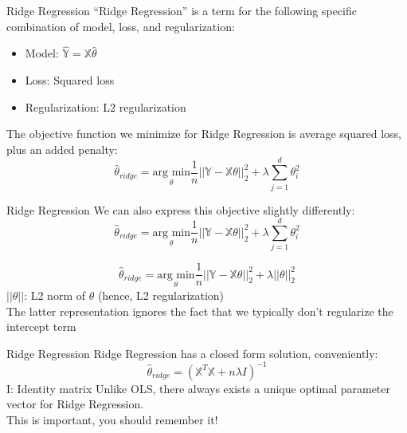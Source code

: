 \documentclass[aspectratio=169]{../latex_main/tntbeamer}  %
\begin{document}
		\begin{frame}{Ridge Regression}
	    “Ridge Regression” is a term for the following specific combination of model, loss, and regularization:
	    \begin{itemize}
	        \item Model: $\mathbb{\hat{Y}} = \mathbb{X}\hat{\theta}$
	        \item Loss: Squared loss
	        \item Regularization: L2 regularization
	    \end{itemize}
	    The objective function we minimize for Ridge Regression is average squared loss, plus an added penalty:
	    \begin{equation*}
	        \hat{\theta}_{ridge} = \underset{\theta}{\text{arg min}}\frac{1}{n}||\mathbb{Y} - \mathbb{X}\theta||_2^2 + \lambda \sum\limits_{j=1}^d\theta_i^2 
	    \end{equation*}
	\end{frame}
	
	
	\begin{frame}{Ridge Regression}
	    We can also express this objective slightly differently:
	    \begin{equation*}
	        \hat{\theta}_{ridge} = \underset{\theta}{\text{arg min}}\frac{1}{n}||\mathbb{Y} - \mathbb{X}\theta||_2^2 + \lambda \sum\limits_{j=1}^d\theta_i^2 
	    \end{equation*}
	    
	    \begin{equation*}
	        \hat{\theta}_{ridge} = \underset{\theta}{\text{arg min}}\frac{1}{n}||\mathbb{Y} - \mathbb{X}\theta||_2^2 + \lambda ||\theta ||_2^2
	    \end{equation*}
	    $||\theta ||$: L2 norm of $\theta$ (hence, L2 regularization)\\
	    \bigskip
	    The latter representation ignores the fact that we typically don’t regularize the intercept term
	\end{frame}
	
	
	\begin{frame}[c]{Ridge Regression}
	    Ridge Regression has a closed form solution, conveniently:
	    \begin{equation*}
	        \hat{\theta}_{ridge} = (\mathbb{X}^T\mathbb{X} + n\lambda I)^{-1} 
	    \end{equation*}
	    I: Identity matrix
	    Unlike OLS, there always exists a unique optimal parameter vector for Ridge Regression.\\
        This is important, you should remember it!

	\end{frame}
	
\end{document}

